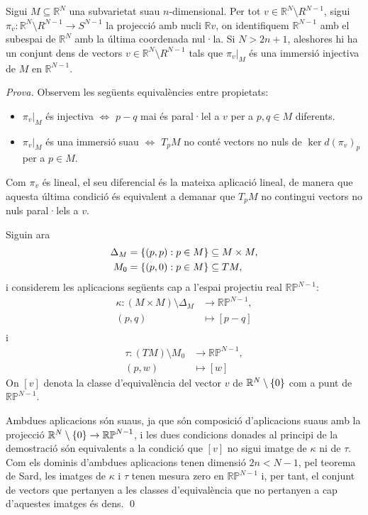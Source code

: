 \begin{lema}
    Sigui $M\subseteq\mathbb R^N$ una subvarietat suau $n$-dimensional. Per tot $v\in \mathbb R^N\setminus R^{N-1}$, sigui $\pi_v : \mathbb R^N\setminus R^{N-1}\to S^{N-1}$ la projecció amb nucli $\mathbb Rv$, on identifiquem $\mathbb R^{N-1}$ amb el subespai de $\mathbb R^N$ amb la última coordenada nul·la. Si $N>2n+1$, aleshores hi ha un conjunt dens de vectors $v\in \mathbb R^N\setminus R^{N-1}$ tals que $\pi_v|_M$ és una immersió injectiva de $M$ en $\mathbb R^{N-1}$.
\end{lema}
{
    \color{black} 
    \textit{Prova.}
    Observem les següents equivalències entre propietats:
    \begin{itemize}
        \item $\pi_v|_M$ és injectiva $\iff$ $p-q$ mai és paral·lel a $v$ per a $p,q\in M$ diferents.
        \item $\pi_v|_M$ és una immersió suau $\iff$ $T_pM$ no conté vectors no nuls de $\ker d(\pi_v)_p$ per a $p\in M$.
    \end{itemize}
    Com $\pi_v$ és lineal, el seu diferencial és la mateixa aplicació lineal, de manera que aquesta última condició és equivalent a demanar que $T_pM$ no contingui vectors no nuls paral·lels a $v$.

    Siguin ara
    \begin{align*}
        \Delta_M &= \{(p,p):p\in M\}\subseteq M\times M,\\
        M_0 &= \{(p,0):p\in M\}\subseteq TM,\\
    \end{align*}
    i considerem les aplicacions següents cap a l'espai projectiu real $\mathbb {RP}^{N-1}$:
    \begin{align*}
        \kappa:(M\times M)\setminus\Delta_M&\to\mathbb {RP}^{N-1},\\
        (p,q) &\mapsto [p-q]\\
    \end{align*}
    i
    \begin{align*}
        \tau:(TM)\setminus M_0&\to\mathbb {RP}^{N-1},\\
        (p,w) &\mapsto [w]
    \end{align*}
    On $[v]$ denota la classe d'equivalència del vector $v$ de $\mathbb R^N\setminus\{0\}$ com a punt de $\mathbb {RP}^{N-1}$.

    Ambdues aplicacions són suaus, ja que són composició d'aplicacions suaus amb la projecció $\mathbb R^N\setminus\{0\}\to\mathbb {RP}^{N-1}$, i les dues condicions donades al principi de la demostració són equivalents a la condició que $[v]$ no sigui imatge de $\kappa$ ni de $\tau$. Com els dominis d'ambdues aplicacions tenen dimensió $2n<N-1$, pel teorema de Sard, les imatges de $\kappa$ i $\tau$ tenen mesura zero en $\mathbb {RP}^{N-1}$ i, per tant, el conjunt de vectors que pertanyen a les classes d'equivalència que no pertanyen a cap d'aquestes imatges és dens.
    \qed
}

